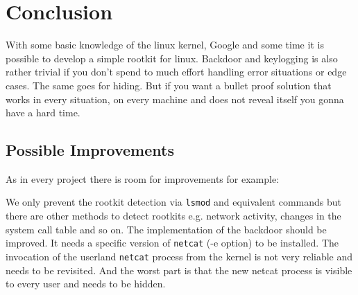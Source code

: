 \documentclass[12pt]{article}
\newcommand{\shellcmdinline}[1]{\texttt{\footnotesize #1}}
\begin{document}
\newpage
\section{Conclusion}

With some basic knowledge of the linux kernel, Google and some time it is possible to develop a simple rootkit for linux. Backdoor and keylogging is also rather trivial if you don't spend to much effort handling error situations or edge cases. The same goes for hiding. But if you want a bullet proof solution that works in every situation, on every machine and does not reveal itself you gonna have a hard time. 

\label{sec:conc}
\subsection{Possible Improvements}
As in every project there is room for improvements for example:

We only prevent the rootkit detection via \shellcmdinline{lsmod} and equivalent commands but there are other methods to detect rootkits e.g. network activity, changes in the system call table and so on. The implementation of the backdoor should be improved. It needs a specific version of \shellcmdinline{netcat} (-e option) to be installed. The invocation of the userland \shellcmdinline{netcat} process from the kernel is not very reliable and needs to be revisited. And the worst part is that the new netcat process is visible to every user and needs to be hidden.

\nocite{a1}
\nocite{b2}
\nocite{c3}
\nocite{d4}
\nocite{e5}
\nocite{f6}


{}

\end{document}
